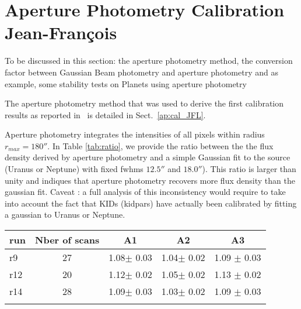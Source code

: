 \section{Aperture Photometry Calibration {\color{blue} Jean-Fran\c cois}}

To be discussed in this section: the aperture photometry method, the conversion factor between Gaussian Beam photometry and aperture photometry and as example, some stability tests on Planets using aperture photometry

The aperture photometry method that was used to derive the first calibration results as reported in~\cite{Adam18} is detailed in Sect.~\ref{ap:cal_JFL}. 



Aperture photometry integrates the intensities of all pixels within radius $r_{max}=180''$. In Table \ref{tab:ratio}, we provide the ratio between the 
the flux density derived by aperture photometry and a simple Gaussian fit to the source (Uranus or Neptune) with fixed fwhms $12.5''$ and $18.0''$).
This ratio is larger than unity and indiques that aperture photometry recovers more flux density than the gaussian fit. Caveat : a full analysis
of this inconsistency would require to take into account the fact that KIDs (kidpars) have actually been calibrated by fitting a gaussian to Uranus 
or Neptune.    


\begin{table*}[!h]
\caption{ratio aperture photometry / gaussian fit flux densities   }
\label{tab:ratio}
\centering
\begin{tabular}{l| c | c c c }
\hline\hline
\noalign{\smallskip}
run     & Nber of scans  &  A1    &    A2   &  A3    \\
\hline
r9    & 27  &  1.08$\pm$ 0.03    &  1.04$\pm$ 0.02 & 1.09 $\pm$ 0.03     \\
r12   & 20  &  1.12$\pm$ 0.02    &  1.05$\pm$ 0.02 & 1.13 $\pm$ 0.02     \\
r14   & 28  &  1.09$\pm$ 0.03    &  1.03$\pm$ 0.02 & 1.09 $\pm$ 0.03     \\
\noalign{\smallskip}
\hline
\end{tabular}
\end{table*}
